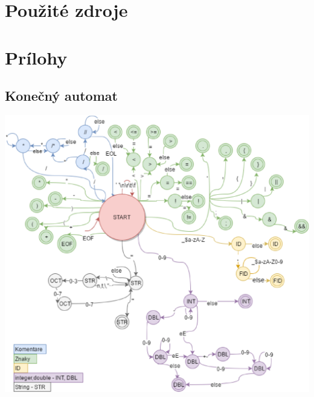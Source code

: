 \documentclass[11pt,a4paper]{article}
\begin{document}
	\section{Použité zdroje}
	{}
	

	\newpage
	\section{Prílohy}


	\subsection{Konečný automat}
	\label{app:automat}
	\hspace{2cm}
	\begin{center}
		\scalebox{0.7} {\includegraphics{IFJ.eps}}
	\end{center}


	\newpage
\end{document}
